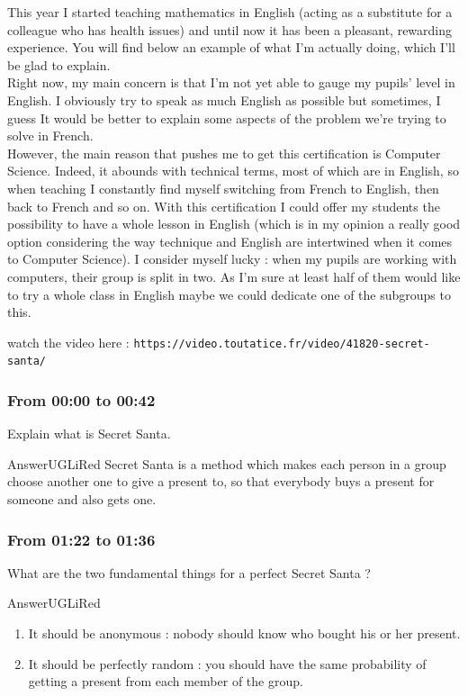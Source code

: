 \documentclass[12pt,a4paper,article,english,firamath]{nsi}
\begin{document}
This year I started teaching mathematics in English (acting as a substitute for a colleague who has health issues) and until now it has been a pleasant, rewarding experience. You will find below an example of what I'm actually doing, which I'll be glad to explain.\\
Right now, my main concern is that I'm not yet able to gauge my pupils' level in English. I obviously try to speak as much English as possible but sometimes, I guess It would be better to explain some aspects of the problem we're trying to solve in French.\\

However, the main reason that pushes me to get this certification is Computer Science. Indeed, it abounds with technical terms, most of which are in English, so when teaching I constantly find myself switching from French to English, then back to French and so on. With this certification I could offer my students the possibility to have a whole lesson in English (which is in my opinion a really good option considering the way technique and English are intertwined when it comes to Computer Science). I consider myself lucky : when my pupils are working with computers, their group is split in two. As I'm sure at least half of them would like to try a whole class in English maybe we could dedicate one of the  subgroups to this.

\newpage 
{}
\maketitle
watch the video here : {\color{UGLiBlue} \texttt{https://video.toutatice.fr/video/41820-secret-santa/}}
\subsubsection*{From 00:00 to 00:42}
Explain what is Secret Santa.
\begin{encadrecolore}{Answer}{UGLiRed}
    Secret Santa is a method which makes each person in a group choose another one to give a present to, so that everybody buys a present for someone and also gets one.
\end{encadrecolore}
\subsubsection*{From 01:22 to 01:36}
What are the two fundamental things for a perfect Secret Santa ?
\begin{encadrecolore}{Answer}{UGLiRed}
    \begin{enumerate}
        \item It should be anonymous : nobody should know who bought his or her present.
        \item It should be perfectly random : you should have the same probability of getting a present from each member of the group.
    \end{enumerate}
\end{encadrecolore}
\end{document}
